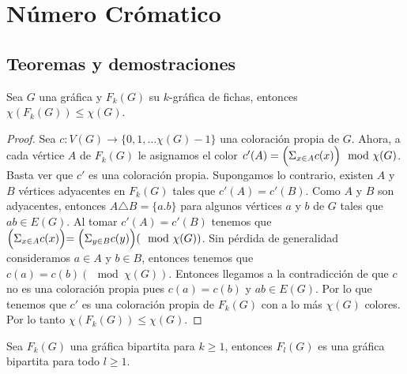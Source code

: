 \chapter{N\'umero Cr\'omatico}%
\label{cap:num cromatico}

\section{Teoremas y demostraciones}%


\begin{teorema}
\label{teo:num cromatico de G y F(G)}
    Sea $G$ una gr\'afica y $F_k(G)$ su $k$-gr\'afica de fichas, entonces
    $\chi(F_k(G)) \leq \chi (G)$.
\end{teorema}

\begin{proof}
    Sea $c: V(G) \rightarrow \{0,1, \dots \chi(G)-1\}$ una coloraci\'on
    propia de $G$. Ahora, a cada v\'ertice $A$ de $F_k(G)$ le asignamos el
    color $ c'(A)= \Bigl(\Sigma_{x \in A}c(x)\Bigl) \mod \chi(G)$. Basta ver
    que $c'$ es una coloraci\'on propia. Supongamos lo contrario, existen
    $A$ y $B$ v\'ertices adyacentes en $F_k(G)$ tales que $c'(A) = c'(B)$.
    Como $A$ y $B$ son adyacentes, entonces $A \triangle B = \{a.b\}$ para
    algunos v\'ertices $a$ y $b$ de $G$ tales que $ab \in E(G)$. Al tomar
    $c'(A) = c'(B)$ tenemos que $\Bigl(\Sigma_{x \in A}c(x)\Bigl) =
    \Bigl(\Sigma_{y \in B}c(y)\Bigl) (\mod \chi(G))$. Sin p\'erdida de
    generalidad consideramos $a \in A$ y $b \in B$, entonces tenemos que
    $c(a) = c(b) (\mod \chi(G))$. Entonces llegamos a la contradicci\'on de
    que $c$ no es una coloraci\'on propia pues $c(a) = c(b)$ y $ab \in
    E(G)$. Por lo que tenemos que $c'$ es una coloraci\'on propia de
    $F_k(G)$ con a lo m\'as $\chi (G)$ colores. Por lo tanto $\chi(F_k(G))
    \leq \chi (G)$.
\end{proof}

\begin{proposicion}
\label{prop:biparticion F(G)}
    Sea $F_k(G)$ una gr\'afica bipartita para $k \geq 1$, entonces $F_l(G)$
    es una gr\'afica bipartita para todo $l \geq 1$.
\end{proposicion}

